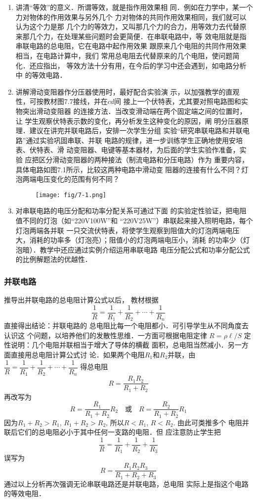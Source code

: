 \begin{enumerate}
    \item 讲清“等效”的意义．所谓等效，就是指作用效果相
同．例如在力学中，某一个力对物体的作用效果与另外几个
力对物体的共同作用效果相同，我们就可以认为这个力是那
几个力的等效力，又叫那几个力的合力，用等效力去代替原
来那几个力，在处理某些问题时会更简便．在串联电路中，等
效电阻就是指串联电路的总电阻，它在电路中起作用效果
跟原来几个电阻的共同作用效果相当，在电路计算中，我们
常用总电阻去代替原来的几个电阻，使问题简化．还应指出，
等效方法十分有用，在今后的学习中还会遇到，如电路分析中
的等效电路．
\item 讲解滑动变阻器作分压器使用时，最好配合实验演
示，以加强教学的直观性，可按教材图7.7接线，并在$cd$间
接上一个伏特表，尤其要对照电路图和实物突出滑动变阻器
的连接方法．当改变滑动端在两个固定端之间的位置时，让
学生观察伏特表示数的变化，再分析发生这种变化的原因，阐
明分压器原理．建议在讲完并联电路后，安排一次学生分组
实验“研究串联电路和并联电路”通过实验巩固串联、并联
电路的规律，进一步训练学生正确地使用安培表、伏特表、滑
动变阻器、电键等基本器材，为后面的学生实验作准备，实验
应把区分滑动变阻器的两种接法（制流电路和分压电路）作为
重要内容，具体电路如图7.1所示，比较这两种电路中滑动变
阻器的连接有什么不同？灯泡两端电压变化的范围有何不同？

\begin{figure}[htp]
    \centering
  \texttt{[image: fig/7-1.png]}
    \caption{}
\end{figure}
\item 对串联电路的电压分配和功率分配关系可通过下面
的实验定性验证，把电阻值不同的灯泡（如“220V100W”和
“220V25W”）串联起来接入照明电路，每个灯泡两端各并联
一只交流伏特表，将使学生观察到阻值大的灯泡两端电压
大，消耗的功率多（灯泡亮）；阻值小的灯泡两端电压小，消耗
的功率少（灯泡暗）．教学中还应通过实例介绍运用串联电路
电压分配公式和功率分配公式的比例解题法的优越性．
\end{enumerate}

\subsubsection{并联电路}

推导出并联电路的总电阻计算公式以后，
教材根据
\[\frac{1}{R}=\frac{1}{R_1}+\frac{1}{R_2}+\cdots+\frac{1}{R_n}\]
直接得出结论：并联电路的
总电阻比每一个电阻都小．可引导学生从不同角度去认识这
个问题，以培养他们的发散性思维．一方面可根据电阻定律
$R=\rho\ell/S$
定性说明：几个电阻并联相当于增大了导体的横截
面积，总电阻当然减小．另一方面直接用总电阻计算公式讨
论．如果两个电阻$R_1$和$R_2$并联，由
$\dfrac{1}{R}=\dfrac{1}{R_1}+\dfrac{1}{R_2}+\cdots+\dfrac{1}{R_n}$
得总电阻
\[R=\frac{R_1R_2}{R_1+R_2}\]
再改写为
\[R=\frac{R_1}{R_1+R_2}R_2\quad \text{或}\quad R=\frac{R_2}{R_1+R_2}R_1\]
因为$R_1+R_2>R_1$, $R_1+R_2>R_2$, 所以$R<R_1$, $R<R_2$. 由此可类推多个
电阻并联后它们的总电阻必小于其中任何一支路的电阻．但
应注意防止学生把
\[\frac{1}{R}=\frac{1}{R_1}+\frac{1}{R_2}+\frac{1}{R_3}\]
误写为
\[R=\frac{R_1R_2R_3}{R_1+R_2+R_3}\]
通过以上分析再次强调无论串联电路还是并联电路，总电阻
实际上是指这个电路的等效电阻．

